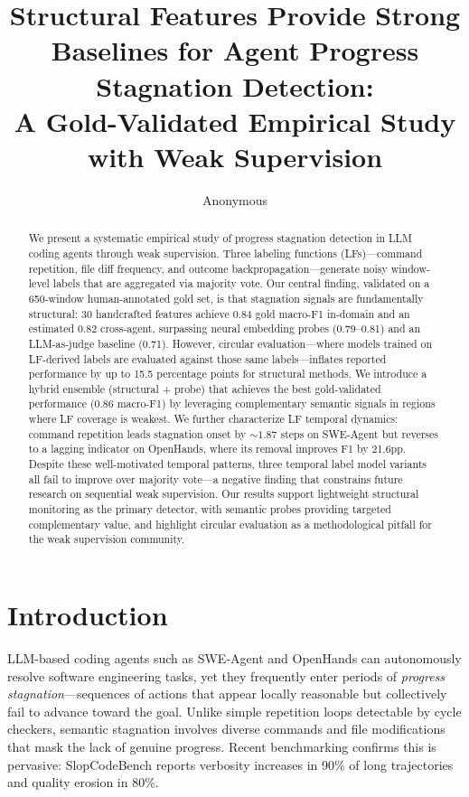 \documentclass[11pt]{article}
\title{Structural Features Provide Strong Baselines for Agent Progress Stagnation Detection:\\A Gold-Validated Empirical Study with Weak Supervision}
\author{Anonymous}
\date{}
\begin{document}
\maketitle

\begin{abstract}
We present a systematic empirical study of progress stagnation detection in LLM coding agents through weak supervision.
Three labeling functions (LFs)---command repetition, file diff frequency, and outcome backpropagation---generate noisy window-level labels that are aggregated via majority vote.
Our central finding, validated on a 650-window human-annotated gold set, is that stagnation signals are fundamentally structural: 30 handcrafted features achieve 0.84 gold macro-F1 in-domain and an estimated 0.82 cross-agent, surpassing neural embedding probes (0.79--0.81) and an LLM-as-judge baseline (0.71).
However, circular evaluation---where models trained on LF-derived labels are evaluated against those same labels---inflates reported performance by up to 15.5 percentage points for structural methods.
We introduce a hybrid ensemble (structural + probe) that achieves the best gold-validated performance (0.86 macro-F1) by leveraging complementary semantic signals in regions where LF coverage is weakest.
We further characterize LF temporal dynamics: command repetition leads stagnation onset by ${\sim}1.87$ steps on SWE-Agent but reverses to a lagging indicator on OpenHands, where its removal improves F1 by 21.6pp.
Despite these well-motivated temporal patterns, three temporal label model variants all fail to improve over majority vote---a negative finding that constrains future research on sequential weak supervision.
Our results support lightweight structural monitoring as the primary detector, with semantic probes providing targeted complementary value, and highlight circular evaluation as a methodological pitfall for the weak supervision community.
\end{abstract}

\section{Introduction}
\label{sec:intro}

LLM-based coding agents such as SWE-Agent \citep{yang2024swe} and OpenHands \citep{wang2024openhands} can autonomously resolve software engineering tasks, yet they frequently enter periods of \emph{progress stagnation}---sequences of actions that appear locally reasonable but collectively fail to advance toward the goal.
Unlike simple repetition loops detectable by cycle checkers, semantic stagnation involves diverse commands and file modifications that mask the lack of genuine progress.
Recent benchmarking confirms this is pervasive: SlopCodeBench \citep{slopcodebench2026} reports verbosity increases in 90\% of long trajectories and quality erosion in 80\%.
\end{document}
